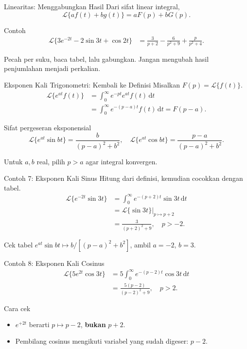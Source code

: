 \documentclass[aspectratio=169,11pt]{beamer}
\newcommand{\Lap}{\mathcal{L}}
\newcommand{\dd}{\,\mathrm{d}}
\begin{document}
\begin{frame}{Linearitas: Menggabungkan Hasil}
Dari sifat linear integral,
\[
\boxed{\Lap\{af(t)+bg(t)\}=aF(p)+bG(p)}.
\]
\begin{exampleblock}{Contoh}
\[
\begin{aligned}
\Lap\{3e^{-2t}-2\sin3t+\cos2t\}
&=\frac3{p+2}-\frac6{p^2+9}+\frac{p}{p^2+4}.
\end{aligned}
\]
\end{exampleblock}
\small Pecah per suku, baca tabel, lalu gabungkan. Jangan mengubah hasil penjumlahan menjadi perkalian.
\end{frame}

\begin{frame}{Eksponen Kali Trigonometri: Kembali ke Definisi}
Misalkan $F(p)=\Lap\{f(t)\}$.
\[
\begin{aligned}
\Lap\{e^{at}f(t)\}
&=\int_0^\infty e^{-pt}e^{at}f(t)\dd t\\
&=\int_0^\infty e^{-(p-a)t}f(t)\dd t
=\boxed{F(p-a)}.
\end{aligned}
\]
\begin{block}{Sifat pergeseran eksponensial}
\[
\Lap\{e^{at}\sin bt\}=\frac{b}{(p-a)^2+b^2},\quad
\Lap\{e^{at}\cos bt\}=\frac{p-a}{(p-a)^2+b^2}.
\]
\end{block}
\small Untuk $a,b$ real, pilih $p>a$ agar integral konvergen.
\end{frame}

\begin{frame}{Contoh 7: Eksponen Kali Sinus}
Hitung dari definisi, kemudian cocokkan dengan tabel.
\[
\begin{aligned}
\Lap\{e^{-2t}\sin3t\}
&=\int_0^\infty e^{-(p+2)t}\sin3t\dd t\\
&=\left.\Lap\{\sin3t\}\right|_{p\mapsto p+2}\\
&=\boxed{\frac3{(p+2)^2+9}},\quad p>-2.
\end{aligned}
\]
\begin{exampleblock}{Cek tabel}
$e^{at}\sin bt\mapsto b/[(p-a)^2+b^2]$, ambil $a=-2$, $b=3$.
\end{exampleblock}
\end{frame}

\begin{frame}{Contoh 8: Eksponen Kali Cosinus}
\[
\begin{aligned}
\Lap\{5e^{2t}\cos3t\}
&=5\int_0^\infty e^{-(p-2)t}\cos3t\dd t\\
&=\boxed{\frac{5(p-2)}{(p-2)^2+9}},\quad p>2.
\end{aligned}
\]
\begin{alertblock}{Cara cek}
\begin{itemize}
\item $e^{+2t}$ berarti $p\mapsto p-2$, \textbf{bukan} $p+2$.
\item Pembilang cosinus mengikuti variabel yang sudah digeser: $p-2$.
\end{itemize}
\end{alertblock}
\end{frame}
\end{document}
